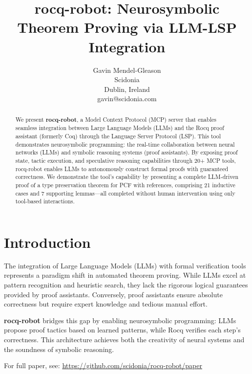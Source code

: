 \documentclass[11pt]{article}
\title{rocq-robot: Neurosymbolic Theorem Proving via LLM-LSP Integration}
\author{Gavin Mendel-Gleason\\Scidonia\\Dublin, Ireland\\gavin@scidonia.com}
\date{}
\begin{document}
\maketitle

\begin{abstract}
We present \textbf{rocq-robot}, a Model Context Protocol (MCP) server that enables seamless integration between Large Language Models (LLMs) and the Rocq proof assistant (formerly Coq) through the Language Server Protocol (LSP). This tool demonstrates neurosymbolic programming: the real-time collaboration between neural networks (LLMs) and symbolic reasoning systems (proof assistants). By exposing proof state, tactic execution, and speculative reasoning capabilities through 20+ MCP tools, rocq-robot enables LLMs to autonomously construct formal proofs with guaranteed correctness. We demonstrate the tool's capability by presenting a complete LLM-driven proof of a type preservation theorem for PCF with references, comprising 21 inductive cases and 7 supporting lemmas—all completed without human intervention using only tool-based interactions.
\end{abstract}

\section{Introduction}

The integration of Large Language Models (LLMs) with formal verification tools represents a paradigm shift in automated theorem proving. While LLMs excel at pattern recognition and heuristic search, they lack the rigorous logical guarantees provided by proof assistants. Conversely, proof assistants ensure absolute correctness but require expert knowledge and tedious manual effort.

\textbf{rocq-robot} bridges this gap by enabling neurosymbolic programming: LLMs propose proof tactics based on learned patterns, while Rocq verifies each step's correctness. This architecture achieves both the creativity of neural systems and the soundness of symbolic reasoning.

For full paper, see: \url{https://github.com/scidonia/rocq-robot/paper}
\end{document}
